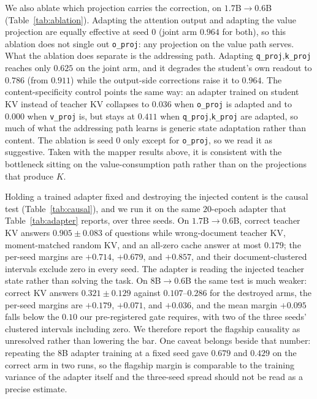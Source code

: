 \documentclass[11pt]{article}
\begin{document}
We also ablate which projection carries the correction, on $1.7$B$\to0.6$B
(Table~\ref{tab:ablation}). Adapting the attention output and adapting the value
projection are equally effective at seed 0 (joint arm $0.964$ for both), so this
ablation does not single out \texttt{o\_proj}: any projection on the value path
serves. What the ablation does separate is the addressing path. Adapting
\texttt{q\_proj},\texttt{k\_proj} reaches only $0.625$ on the joint arm, and it
degrades the student's own readout to $0.786$ (from $0.911$) while the
output-side corrections raise it to $0.964$. The content-specificity control
points the same way: an adapter trained on student KV instead of teacher KV
collapses to $0.036$ when \texttt{o\_proj} is adapted and to $0.000$ when
\texttt{v\_proj} is, but stays at $0.411$ when
\texttt{q\_proj},\texttt{k\_proj} are adapted, so much of what the addressing
path learns is generic state adaptation rather than content. The ablation is
seed 0 only except for \texttt{o\_proj}, so we read it as suggestive. Taken with
the mapper results above, it is consistent with the bottleneck sitting on the
value-consumption path rather than on the projections that produce $K$.

Holding a trained adapter fixed and destroying the injected content is the causal
test (Table~\ref{tab:causal}), and we run it on the same $20$-epoch adapter that
Table~\ref{tab:adapter} reports, over three seeds. On $1.7$B$\to0.6$B, correct
teacher KV answers $0.905\pm0.083$ of questions while wrong-document teacher KV,
moment-matched random KV, and an all-zero cache answer at most $0.179$; the
per-seed margins are $+0.714$, $+0.679$, and $+0.857$, and their
document-clustered intervals exclude zero in every seed. The adapter is reading
the injected teacher state rather than solving the task. On $8$B$\to0.6$B the
same test is much weaker: correct KV answers $0.321\pm0.129$ against
$0.107$--$0.286$ for the destroyed arms, the per-seed margins are $+0.179$,
$+0.071$, and $+0.036$, and the mean margin $+0.095$ falls below the $0.10$ our
pre-registered gate requires, with two of the three seeds' clustered intervals
including zero. We therefore report the flagship causality as unresolved rather
than lowering the bar. One caveat belongs beside that number: repeating the $8$B
adapter training at a fixed seed gave $0.679$ and $0.429$ on the correct arm in
two runs, so the flagship margin is comparable to the training variance of the
adapter itself and the three-seed spread should not be read as a precise
estimate.
\end{document}
